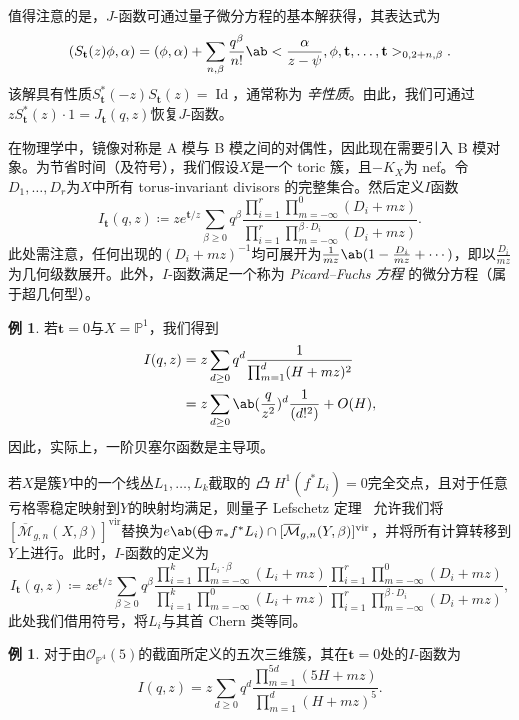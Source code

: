 \documentclass{amsart}
\theoremstyle{definition}
\newtheorem{exm}[thm]{例}
\theoremstyle{remark}
\theoremstyle{plain}
\theoremstyle{definition}
\theoremstyle{remark}
\renewcommand{\P}{\mathbb{P}}
\newcommand{\Mbar}{\overline{\mathcal{M}}}
\newcommand{\mc}[1]{\mathcal{#1}}
\newcommand{\mbf}[1]{\mathbf{#1}}
\newcommand{\mr}[1]{\mathrm{#1}}
\newcommand{\on}[1]{\operatorname{#1}}
\newcommand{\1}{\mathbf{1}}
\newcommand{\2}{\mathbf{2}}
\newcommand{\3}{\mathbf{3}}
\newcommand{\vir}{\mr{vir}}
\begin{document}
值得注意的是，\(J\)-函数可通过量子微分方程的基本解获得，其表达式为
\[ ( S_{\mbf{t}}(z) \phi , \alpha) = (\phi, \alpha) + \sum_{n, \beta} \frac{q^{\beta}}{n!} \ab<\frac{\alpha}{z-\psi}, \phi, \mbf{t}, \ldots, \mbf{t}>_{0, 2+n, \beta}. \]
该解具有性质\(S_{\mbf{t}}^*(-z) S_{\mbf{t}}(z) = \on{Id}\)，通常称为 \textit{辛性质}。由此，我们可通过\(z S_{\mbf{t}}^*(z)\cdot 1 = J_{\mbf{t}}(q, z)\)恢复\(J\)-函数。

在物理学中，镜像对称是 A 模与 B 模之间的对偶性，因此现在需要引入 B 模对象。为节省时间（及符号），我们假设\(X\)是一个 toric 簇，且\(-K_X\)为 nef。令\(D_1, \ldots, D_r\)为\(X\)中所有 torus-invariant divisors 的完整集合。然后定义\(I\)函数
\[
    I_{\mbf{t}}(q, z) \coloneqq z e^{\mbf{t}/z} \sum_{\beta \geq 0} q^{\beta} \frac{\prod_{i=1}^r \prod_{m = -\infty}^{0} (D_i + mz)}{\prod_{i=1}^r \prod_{m=-\infty}^{\beta \cdot D_i} (D_i + mz)}.
\]
此处需注意，任何出现的\((D_i + mz)^{-1}\)均可展开为\(\frac{1}{mz} \ab(1 - \frac{D_i}{mz} + \cdots)\)，即以\(\frac{D_i}{mz}\)为几何级数展开。此外，\(I\)-函数满足一个称为 \textit{Picard--Fuchs 方程} 的微分方程（属于超几何型）。

\begin{exm}
若\(\mbf{t} = 0\)与\(X = \P^1\)，我们得到
    \begin{align*}
        I(q,z) &= z\sum_{d \geq 0} q^d \frac{1}{\prod_{m=1}^d (H + mz)^2} \\
        &= z\sum_{d \geq 0} \ab(\frac{q}{z^2})^d \frac{1}{(d!^2)} + O(H),
    \end{align*}
因此，实际上，一阶贝塞尔函数是主导项。
\end{exm}

若\(X\)是簇\(Y\)中的一个线丛\(L_1, \ldots, L_k\)截取的 \textit{ 凸 } \(H^1(f^* L_i) = 0\)完全交点，且对于任意亏格零稳定映射到\(Y\)的映射均满足，则量子 Lefschetz 定理~\cite{CoatesGivental2007} 允许我们将\([\Mbar_{g,n}(X, \beta)]^{\vir}\)替换为\(e\ab(\bigoplus \pi_* f^* L_i) \cap [\Mbar_{g,n}(Y, \beta)]^{\vir}\)，并将所有计算转移到\(Y\)上进行。此时，\(I\)-函数的定义为
\[
    I_{\mbf{t}}(q,z) \coloneqq z e^{\mbf{t}/z} \sum_{\beta \geq 0} q^{\beta} \frac{\prod_{i=1}^k \prod_{m=-\infty}^{L_i \cdot \beta} (L_i + mz)}{\prod_{i=1}^k \prod_{m=-\infty}^{0} (L_i + mz)} \frac{\prod_{i=1}^r \prod_{m = -\infty}^{0} (D_i + mz)}{\prod_{i=1}^r \prod_{m=-\infty}^{\beta \cdot D_i} (D_i + mz)},
\]
此处我们借用符号，将\(L_i\)与其首 Chern 类等同。

\begin{exm}
对于由\(\mc{O}_{\P^4}(5)\)的截面所定义的五次三维簇，其在\(\mbf{t} = 0\)处的\(I\)-函数为
    \[ I(q,z) = z \sum_{d \geq 0} q^d \frac{\prod_{m=1}^{5d}(5H+mz)}{\prod_{m=1}^d (H+mz)^5}. \]
\end{exm}
\end{document}
